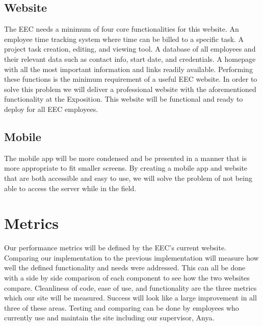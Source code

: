 \documentclass[letterpaper,10pt,titlepage,draftclsnofoot,onecolumn]{IEEEtran}
\begin{document}
\subsection{Website}

The EEC needs a minimum of four core functionalities for this website. An employee time tracking system where time can be billed to a specific task. A project task creation, editing, and viewing tool. A database of all employees and their relevant data such as contact info, start date, and credentials. A homepage with all the most important information and links readily available. Performing these functions is the minimum requirement of a useful EEC website.\newline
In order to solve this problem we will deliver a professional website with the aforementioned functionality at the Exposition. This website will be functional and ready to deploy for all EEC employees.

\subsection{Mobile}

The mobile app will be more condensed and be presented in a manner that is more appropriate to fit smaller screens. By creating a mobile app and website that are both accessible and easy to use, we will solve the problem of not being able to access the server while in the field. 


\section{Metrics}

Our performance metrics will be defined by the EEC’s current website. Comparing our implementation to the previous implementation will measure how well the defined functionality and needs were addressed. This can all be done with a side by side comparison of each component to see how the two websites compare. Cleanliness of code, ease of use, and functionality are the three metrics which our site will be measured. Success will look like a large improvement in all three of these areas. Testing and comparing can be done by employees who currently use and maintain the site including our supervisor, Anya. 
\end{document}
